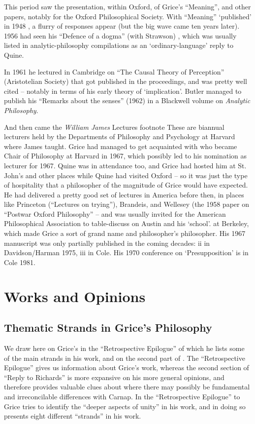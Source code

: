 \documentclass[10pt,titlepage]{book}
\begin{document}
This period saw the presentation, within Oxford, of Grice's ``Meaning'', and other papers, notably for the Oxford Philosophical Society.
With ``Meaning'' `published' in 1948 \cite{Grice48}, a flurry of responses appear (but the big wave came ten years later).
1956 had seen his ``Defence of a dogma'' (with Strawson) \cite{grice56}, which was usually listed in analytic-philosophy compilations as an `ordinary-language' reply to Quine.

In 1961 he lectured in Cambridge on ``The Causal Theory of Perception'' (Aristotelian Society) that got published in the proceedings, and was pretty well cited -- notably in terms of his early theory of `implication'.
Butler managed to publish  his ``Remarks about the senses'' (1962) in a Blackwell volume on \emph{Analytic  Philosophy}.

And then came the \emph{William James} Lectures%
footnote{
These are biannual lecturers held by the Departments of Philosophy  and 
Psychology at Harvard where James taught. Grice had managed to get  acquainted 
with who became Chair of Philosophy at Harvard in 1967, which  possibly led 
to his nomination as lecturer for 1967.
Quine was in attendance too, and Grice had hosted him at St. John's and other places while Quine had visited Oxford -- so it was just the type of hospitality that a philosopher of the magnitude of Grice would have expected.
He had delivered a pretty good set of lectures in America before then, in places like Princeton (``Lectures on  
trying''), Brandeis, and Wellesey (the 1958 paper on ``Postwar Oxford Philosophy''  -- and was usually invited for the American Philosophical Association to table-discuss on Austin and his `school'.
}
at Berkeley, which made Grice a sort of grand name and philosopher's philosopher.
His 1967 manuscript was only partially published in the coming decades: ii in Davidson/Harman 1975, iii in  Cole.
His 1970 conference on `Presupposition' is in Cole 1981.

\section{Works and Opinions}

\subsection{Thematic Strands in Grice's Philosophy}

We draw here on Grice's \cite{grice89} in the ``Retrospective Epilogue'' of which he lists some of the main strands in his work, and on the second part of \cite{grice86b}.
The ``Retrospective Epilogue'' gives us information about Grice's work, whereas the second section of ``Reply to Richards'' is more expansive on his more general opinions, and therefore provides valuable clues about where there may possibly be fundamental and irreconcilable differences with Carnap.
In the ``Retrospective Epilogue'' to \cite{grice88} Grice tries to identify the ``deeper aspects of unity'' in his work, and in doing so presents eight different ``strands'' in his work.
\end{document}

